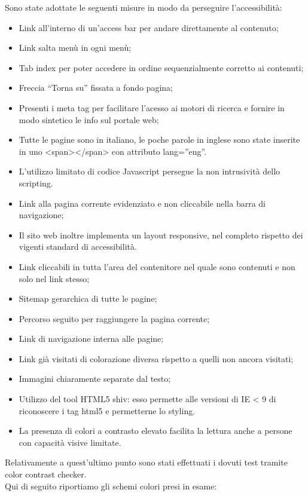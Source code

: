 Sono state adottate le seguenti misure in modo da perseguire l'accessibilità:
\begin{itemize}
	\item Link all’interno di un'access bar per andare direttamente al contenuto;
	\item Link salta menù in ogni menù;
	\item Tab index per poter accedere in ordine sequenzialmente corretto ai contenuti;
	\item Freccia “Torna su” fissata a fondo pagina;
	\item Presenti i meta tag per facilitare l’acesso ai motori di ricerca e fornire in modo sintetico le info sul portale web;
	\item Tutte le pagine sono in italiano, le poche parole in inglese sono state inserite in uno <span></span> con attributo lang=”eng”.
	\item L'utilizzo limitato di codice Javascript persegue la non intrusività dello scripting.
	\item Link alla pagina corrente evidenziato e non cliccabile nella barra di navigazione;
	\item Il sito web inoltre implementa un layout responsive, nel completo rispetto dei vigenti standard di accessibilità.
	\item Link cliccabili in tutta l’area del contenitore nel quale sono contenuti e non solo nel link stesso;
	\item Sitemap gerarchica di tutte le pagine;
	\item Percorso seguito per raggiungere la pagina corrente;
	\item Link di navigazione interna alle pagine;
	\item Link già visitati di colorazione diversa rispetto a quelli non ancora visitati;
	\item Immagini chiaramente separate dal testo;
	\item Utilizzo del tool HTML5 shiv: esso permette alle versioni di IE < 9 di riconoscere i tag html5 e permetterne lo styling.
	\item La presenza di colori a contrasto elevato facilita la lettura anche a 	persone con capacità visive limitate.
	
\end{itemize}

Relativamente a quest'ultimo punto sono stati effettuati i dovuti test tramite color contrast checker.\\
Qui di seguito riportiamo gli schemi colori presi in esame:\\


